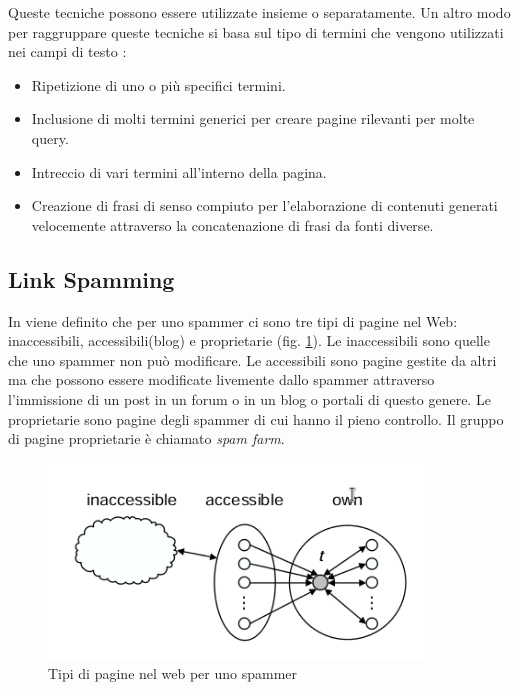 Queste tecniche possono essere utilizzate insieme o separatamente. Un altro modo per raggruppare queste tecniche si basa sul tipo di termini che vengono utilizzati nei campi di testo \cite{ilprints646}:
\begin{itemize}
\item Ripetizione di uno o più specifici termini.
\item Inclusione di molti termini generici per creare pagine rilevanti per molte query.
\item Intreccio di vari termini all'interno della pagina.
\item Creazione di frasi di senso compiuto per l'elaborazione di contenuti generati velocemente attraverso la concatenazione di frasi da fonti diverse.
\end{itemize}

\subsection{Link Spamming}
In \cite{ilprints646} viene definito che per uno spammer ci sono tre tipi di pagine nel Web: inaccessibili, accessibili(blog) e proprietarie (fig. \ref{fig:tipologiaPagine}). Le inaccessibili sono quelle che uno spammer non può modificare. Le accessibili sono pagine gestite da altri ma che possono essere modificate livemente dallo spammer attraverso l'immissione di un post in un forum o in un blog o portali di questo genere. Le proprietarie sono pagine degli spammer di cui hanno il pieno controllo. Il gruppo di pagine proprietarie è chiamato \textit{spam farm}.
\begin{figure} 
 \centering
 \includegraphics[width=10cm]{immagini/tipologiaPagine}
 \caption{Tipi di pagine nel web per uno spammer}
 \label{fig:tipologiaPagine}
\end{figure}

